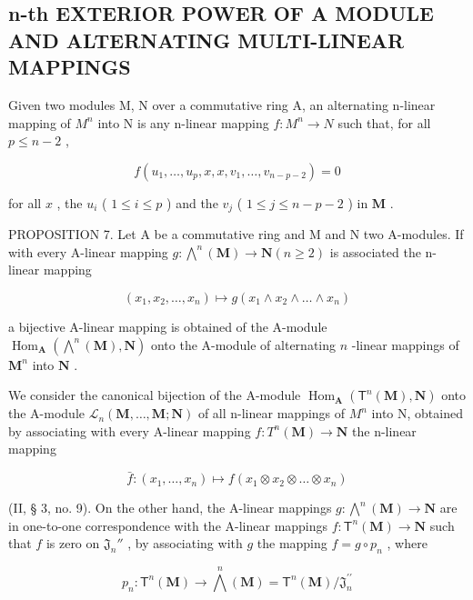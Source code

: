 \subsection{n-th EXTERIOR POWER OF A MODULE AND ALTERNATING MULTI-LINEAR MAPPINGS}

Given two modules M, N over a commutative ring A, an alternating n-linear mapping of \(M^{n}\) into N is any n-linear mapping \(f: M^{n} \to N\) such that, for all \(p \leqslant n - 2\) ,

\[
f (u _ {1}, \dots , u _ {p}, x, x, v _ {1}, \dots , v _ {n - p - 2}) = 0\tag{8}
\]

for all \(x\) , the \(u_{i}\) ( \(1 \leqslant i \leqslant p\) ) and the \(v_{j}\) ( \(1 \leqslant j \leqslant n - p - 2\) ) in \(\mathbf{M}\) .

PROPOSITION 7. Let A be a commutative ring and M and N two A-modules. If with every A-linear mapping \(g: \bigwedge^n (\mathbf{M}) \to \mathbf{N} (n \geqslant 2)\) is associated the n-linear mapping

\[
\left(x _ {1}, x _ {2}, \dots , x _ {n}\right) \mapsto g \left(x _ {1} \wedge x _ {2} \wedge \dots \wedge x _ {n}\right)\tag{9}
\]

a bijective A-linear mapping is obtained of the A-module \(\operatorname{Hom}_{\mathbf{A}}(\bigwedge^{n}(\mathbf{M}), \mathbf{N})\) onto the A-module of alternating \(n\) -linear mappings of \(\mathbf{M}^n\) into \(\mathbf{N}\) .

We consider the canonical bijection of the A-module \(\operatorname{Hom}_{\mathbf{A}}(\mathsf{T}^{n}(\mathbf{M}),\mathbf{N})\) onto the A-module \(\mathcal{L}_{n}(\mathbf{M},\ldots,\mathbf{M};\mathbf{N})\) of all n-linear mappings of \(M^{n}\) into N, obtained by associating with every A-linear mapping \(f: T^{n}(\mathbf{M}) \to \mathbf{N}\) the n-linear mapping

\[
\bar {f} \colon (x _ {1}, \dots , x _ {n}) \mapsto f (x _ {1} \otimes x _ {2} \otimes \dots \otimes x _ {n})
\]

(II, § 3, no. 9). On the other hand, the A-linear mappings \(g \colon \bigwedge^{n}(\mathbf{M}) \to \mathbf{N}\) are in one-to-one correspondence with the A-linear mappings \(f \colon \mathsf{T}^n (\mathbf{M}) \to \mathbf{N}\) such that \(f\) is zero on \(\mathfrak{J}_n''\) , by associating with \(g\) the mapping \(f = g \circ p_n\) , where

\[
p _ {n} \colon \mathsf {T} ^ {n} (\mathbf {M}) \rightarrow \bigwedge^ {n} (\mathbf {M}) = \mathsf {T} ^ {n} (\mathbf {M}) / \mathfrak {J} _ {n} ^ {\prime \prime}
\]

